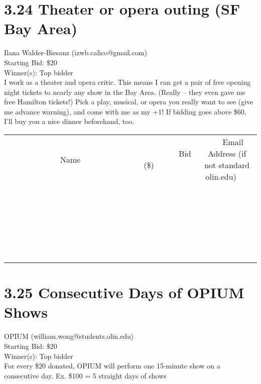 \documentclass[11pt]{article}
\begin{document}
\section*{3.24 Theater or opera outing (SF Bay Area)}
Ilana Walder-Biesanz (izwb.calico@gmail.com) \\
Starting Bid: \$20 \\
Winner(s): 
Top bidder \\
I work as a theater and opera critic. This means I can get a pair of free opening night tickets to nearly any show in the Bay Area. (Really -- they even gave me free Hamilton tickets!) Pick a play, musical, or opera you really want to see (give me advance warning), and come with me as my +1! If bidding goes above \$60, I'll buy you a nice dinner beforehand, too. \\[6ex]
\begin{tabular}{c c c}
~~~~~~~~~~~~~Name~~~~~~~~~~~~~ & ~~~~~~~~~Bid (\$)~~~~~~~~~ & ~~~Email Address (if not standard olin.edu)~~~ \\
 & & \\
\hline
 & & \\
\hline
 & & \\
\hline
 & & \\
\hline
 & & \\
\hline
 & & \\
\hline
 & & \\
\hline
 & & \\
\hline
 & & \\
\hline
 & & \\
\hline
 & & \\
\hline
 & & \\
\hline
 & & \\
\hline
 & & \\
\hline
 & & \\
\hline
 & & \\
\hline
 & & \\
\hline
 & & \\
\hline
 & & \\
\hline
 & & \\
\hline
 & & \\
\hline
 & & \\
\hline
 & & \\
\hline
 & & \\
\hline
 & & \\
\hline
 & & \\
\hline
\end{tabular}
\clearpage
\section*{3.25 Consecutive Days of OPIUM Shows}
OPIUM (william.wong@students.olin.edu) \\
Starting Bid: \$20 \\
Winner(s): 
Top bidder \\
For every \$20 donated, OPIUM will perform one 15-minute show on a consecutive day.  Ex. \$100 = 5 straight days of shows
\end{document}
